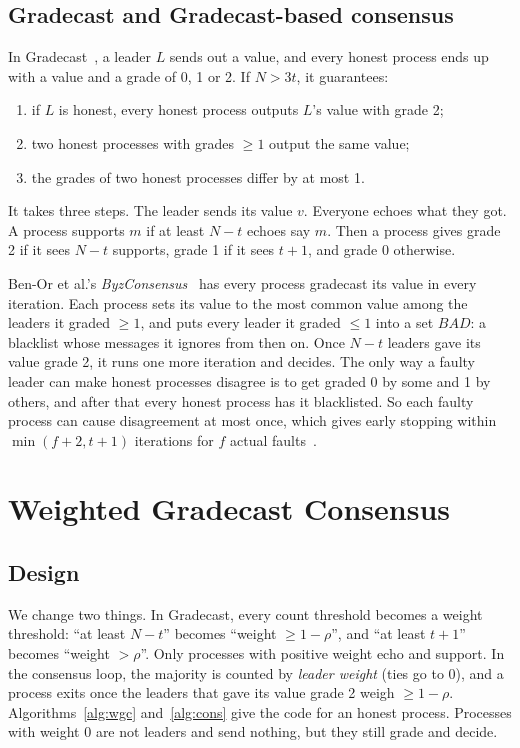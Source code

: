 \documentclass[conference]{IEEEtran}
\theoremstyle{definition}
\newcommand{\BAD}{\mathit{BAD}}
\begin{document}
\subsection{Gradecast and Gradecast-based consensus}
In Gradecast~\cite{feldman1997}, a leader $L$ sends out a value, and every honest process ends up with a value and a grade of 0, 1 or 2. If $N>3t$, it guarantees:
\begin{enumerate}
\item[G1] if $L$ is honest, every honest process outputs $L$'s value with grade 2;
\item[G2] two honest processes with grades $\ge 1$ output the same value;
\item[G3] the grades of two honest processes differ by at most 1.
\end{enumerate}
It takes three steps. The leader sends its value $v$. Everyone echoes what they got. A process supports $m$ if at least $N-t$ echoes say $m$. Then a process gives grade 2 if it sees $N-t$ supports, grade 1 if it sees $t+1$, and grade 0 otherwise.

Ben-Or et al.'s \emph{ByzConsensus}~\cite{benor2010} has every process gradecast its value in every iteration. Each process sets its value to the most common value among the leaders it graded $\ge 1$, and puts every leader it graded $\le 1$ into a set $\BAD$: a blacklist whose messages it ignores from then on. Once $N-t$ leaders gave its value grade 2, it runs one more iteration and decides. The only way a faulty leader can make honest processes disagree is to get graded 0 by some and 1 by others, and after that every honest process has it blacklisted. So each faulty process can cause disagreement at most once, which gives early stopping within $\min(f+2,t+1)$ iterations for $f$ actual faults~\cite[Remark~3.1]{benor2010}.

\section{Weighted Gradecast Consensus}\label{sec:design}

\subsection{Design}
We change two things. In Gradecast, every count threshold becomes a weight threshold: ``at least $N-t$'' becomes ``weight $\ge 1-\rho$'', and ``at least $t+1$'' becomes ``weight $>\rho$''. Only processes with positive weight echo and support. In the consensus loop, the majority is counted by \emph{leader weight} (ties go to 0), and a process exits once the leaders that gave its value grade 2 weigh $\ge 1-\rho$. Algorithms~\ref{alg:wgc} and~\ref{alg:cons} give the code for an honest process. Processes with weight 0 are not leaders and send nothing, but they still grade and decide.
\end{document}
